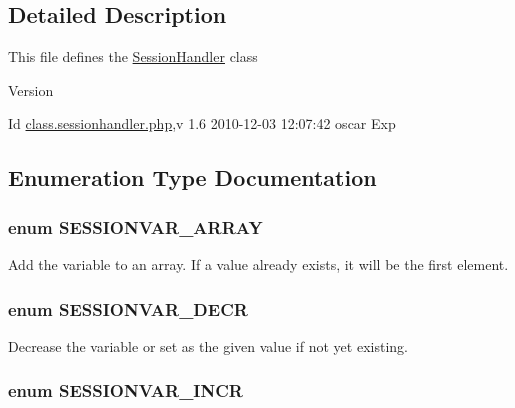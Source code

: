 \subsection{Detailed Description}
This file defines the \hyperlink{classSessionHandler}{SessionHandler} class \begin{DoxyVersion}{Version}

\end{DoxyVersion}
\begin{DoxyParagraph}{Id}
\hyperlink{class_8sessionhandler_8php}{class.sessionhandler.php},v 1.6 2010-\/12-\/03 12:07:42 oscar Exp 
\end{DoxyParagraph}


\subsection{Enumeration Type Documentation}
\subsubsection[{SESSIONVAR\_\-ARRAY}]{\setlength{\rightskip}{0pt plus 5cm}enum {\bf SESSIONVAR\_\-ARRAY}}\label{class_8sessionhandler_8php_a37ebf617beca75ce8d60f06b8c37423a}


Add the variable to an array. If a value already exists, it will be the first element. 

\subsubsection[{SESSIONVAR\_\-DECR}]{\setlength{\rightskip}{0pt plus 5cm}enum {\bf SESSIONVAR\_\-DECR}}\label{class_8sessionhandler_8php_a25d82db99af8d3372efbccb0917f33cb}


Decrease the variable or set as the given value if not yet existing. 

\subsubsection[{SESSIONVAR\_\-INCR}]{\setlength{\rightskip}{0pt plus 5cm}enum {\bf SESSIONVAR\_\-INCR}}\label{class_8sessionhandler_8php_acf42fdbedc1bd30daaebadb12f63c75c}


